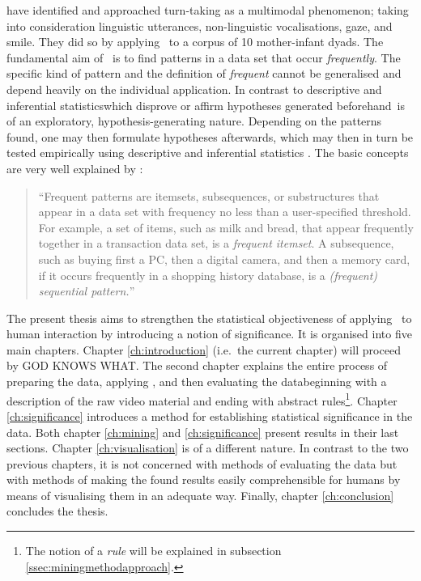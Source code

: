 \citet{rohlfing_multimodal_nodate} have identified and approached turn-taking as a multimodal phenomenon; taking into consideration linguistic utterances, non-linguistic vocalisations, gaze, and smile.
They did so by applying \fpmlower\ to a corpus of 10 mother-infant dyads.
The fundamental aim of \fpmlower\ is to find patterns in a data set that occur \emph{frequently}.
The specific kind of pattern and the definition of \emph{frequent} cannot be generalised and depend heavily on the individual application.
In contrast to descriptive and inferential statistics\dash which disprove or affirm hypotheses generated beforehand\dash \fpmlower\ is of an exploratory, hypothesis-generating nature.
Depending on the patterns found, one may then formulate hypotheses afterwards, which may then in turn be tested empirically using descriptive and inferential statistics \cite[]{rohlfing_multimodal_nodate,han_data_2012}. %
The basic concepts are very well explained by \citet[, emphasis in original]{han_frequent_2007}:
\begin{quote}
``Frequent patterns are itemsets, subsequences, or substructures that appear in a data set with frequency no less than a user-specified threshold.
For example, a set of items, such as milk and bread, that appear frequently together in a transaction data set, is a \emph{frequent itemset}.
A subsequence, such as buying first a PC, then a digital camera, and then a memory card, if it occurs frequently in a shopping history database, is a \emph{(frequent) sequential pattern.}''
\end{quote}

The present thesis aims to strengthen the statistical objectiveness of applying \fpmlower\ to human interaction by introducing a notion of significance.
It is organised into five main chapters.
Chapter \ref{ch:introduction} (i.e.\ the current chapter) will proceed by GOD KNOWS WHAT.
The second chapter explains the entire process of preparing the data, applying \fpmlower, and then evaluating the data\dash beginning with a description of the raw video material and ending with abstract rules\footnote{The notion of a \emph{rule} will be explained in subsection \ref{ssec:miningmethodapproach}.}.
Chapter \ref{ch:significance} introduces a method for establishing statistical significance in the data.
Both chapter \ref{ch:mining} and \ref{ch:significance} present results in their last sections.
Chapter \ref{ch:visualisation} is of a different nature.
In contrast to the two previous chapters, it is not concerned with methods of evaluating the data but with methods of making the found results easily comprehensible for humans by means of visualising them in an adequate way.
Finally, chapter \ref{ch:conclusion} concludes the thesis.




